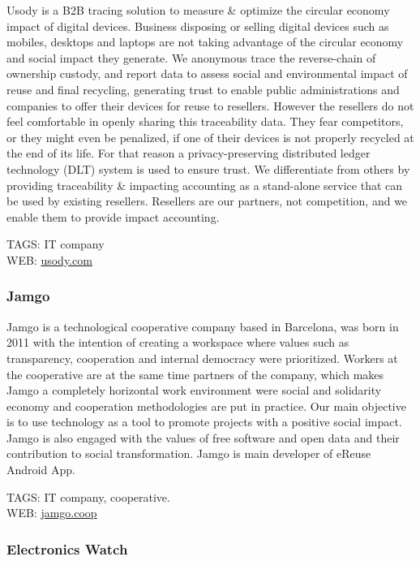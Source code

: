 \documentclass[
]{book}
\begin{document}
Usody is a B2B tracing solution to measure \& optimize the circular economy impact of digital devices. Business disposing or selling digital devices such as mobiles, desktops and laptops are not taking advantage of the circular economy and social impact they generate. We anonymous trace the reverse-chain of ownership custody, and report data to assess social and environmental impact of reuse and final recycling, generating trust to enable public administrations and companies to offer their devices for reuse to resellers. However the resellers do not feel comfortable in openly sharing this traceability data. They fear competitors, or they might even be penalized, if one of their devices is not properly recycled at the end of its life. For that reason a privacy-preserving distributed ledger technology (DLT) system is used to ensure trust. We differentiate from others by providing traceability \& impacting accounting as a stand-alone service that can be used by existing resellers. Resellers are our partners, not competition, and we enable them to provide impact accounting.

TAGS: IT company\\
WEB: \href{http://usody.com}{usody.com}

\hypertarget{jamgo}{%
\subsubsection{Jamgo}\label{jamgo}}

Jamgo is a technological cooperative company based in Barcelona, was born in 2011 with the intention of creating a workspace where values such as transparency, cooperation and internal democracy were prioritized. Workers at the cooperative are at the same time partners of the company, which makes Jamgo a completely horizontal work environment were social and solidarity economy and cooperation methodologies are put in practice. Our main objective is to use technology as a tool to promote projects with a positive social impact. Jamgo is also engaged with the values of free software and open data and their contribution to social transformation. Jamgo is main developer of eReuse Android App.

TAGS: IT company, cooperative.\\
WEB: \href{http://jamgo.coop}{jamgo.coop}

\hypertarget{electronics-watch}{%
\subsubsection{Electronics Watch}\label{electronics-watch}}
\end{document}
